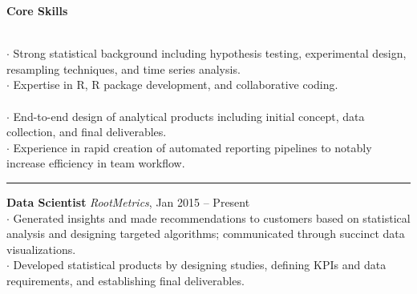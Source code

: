 \documentclass[letterpaper, onecolumn, oneside]{article}
\newcommand{\dotindent}{\hspace*{.25in}$\cdot$ }
\newcommand{\spaceindent}{\hspace*{0.25in}}
\begin{document}
\begin{flushleft}


\textbf{\large Core Skills}
\vspace*{0.05in}

\spaceindent {\bf Statistics and Analysis} \\
\dotindent Strong statistical background including hypothesis testing, experimental design, resampling techniques, and time series analysis. \\
\dotindent Expertise in R, R package development, and collaborative coding. %
~\\

\spaceindent {\bf Analytical Product Development} \\
\dotindent End-to-end design of analytical products including initial concept, data collection, and final deliverables. \\
\dotindent Experience in rapid creation of automated reporting pipelines to notably increase efficiency in team workflow.   \\

\textcolor{litegrey}{\rule{\textwidth}{.1pt}}


\vspace*{0.1in}



\textbf{\large Data Scientist} \emph{RootMetrics}, Jan 2015 -- Present \\
\dotindent Generated insights and made recommendations to customers based on statistical analysis and designing targeted algorithms; communicated through succinct data visualizations.  \\
\dotindent Developed statistical products by designing studies, defining KPIs and data requirements, and establishing final deliverables.  \\
~\\


\end{flushleft}
\end{document}
